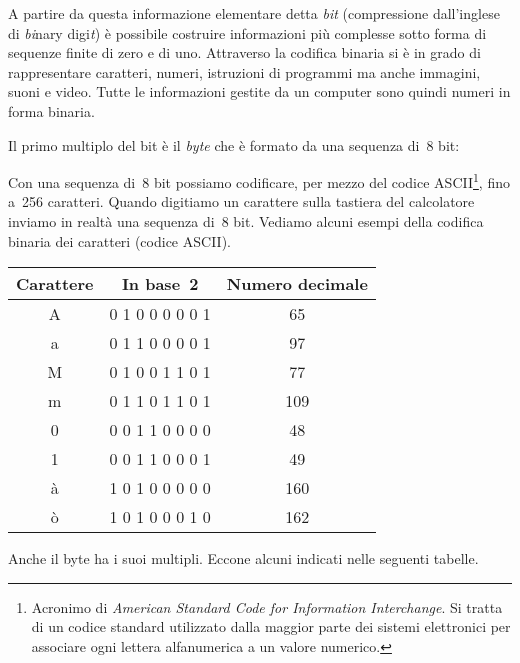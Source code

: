 A partire da questa informazione elementare detta \textit{bit}
(compressione dall'inglese di \textit{bi}nary
digi\textit{t}) è possibile costruire informazioni più complesse
sotto forma di sequenze finite di zero e di uno. Attraverso la codifica
binaria si è in grado di rappresentare caratteri, numeri, istruzioni
di programmi ma anche immagini, suoni e video. Tutte le informazioni
gestite da un computer sono quindi numeri in forma binaria.

Il primo multiplo del bit è il \textit{byte} che è formato da una
sequenza di~8 bit:
 \begin{center}

 \end{center}

Con una sequenza di~8 bit possiamo codificare, per mezzo del codice ASCII\footnote{Acronimo di \textit{American Standard Code for Information Interchange}. Si tratta di un codice standard utilizzato dalla maggior parte dei sistemi elettronici per associare ogni lettera alfanumerica a un valore numerico.}, fino a~256 caratteri. Quando digitiamo un carattere sulla
tastiera del calcolatore inviamo in realtà una sequenza di~8 bit.
Vediamo alcuni esempi della codifica binaria dei caratteri (codice ASCII).

\begin{table}[!h]
\begin{center}
\begin{tabular}{ccc}
\toprule
Carattere & In base~2 & Numero decimale\\
\midrule
A & 0 1 0 0 0 0 0 1 & 65\\
a & 0 1 1 0 0 0 0 1 & 97\\
M & 0 1 0 0 1 1 0 1 & 77\\
m & 0 1 1 0 1 1 0 1 & 109\\
0 & 0 0 1 1 0 0 0 0 & 48\\
1 & 0 0 1 1 0 0 0 1 & 49\\
à & 1 0 1 0 0 0 0 0 & 160\\
ò & 1 0 1 0 0 0 1 0 & 162\\
\bottomrule
\end{tabular}
\end{center}
\end{table}

Anche il byte ha i suoi multipli. Eccone alcuni indicati nelle seguenti tabelle.

